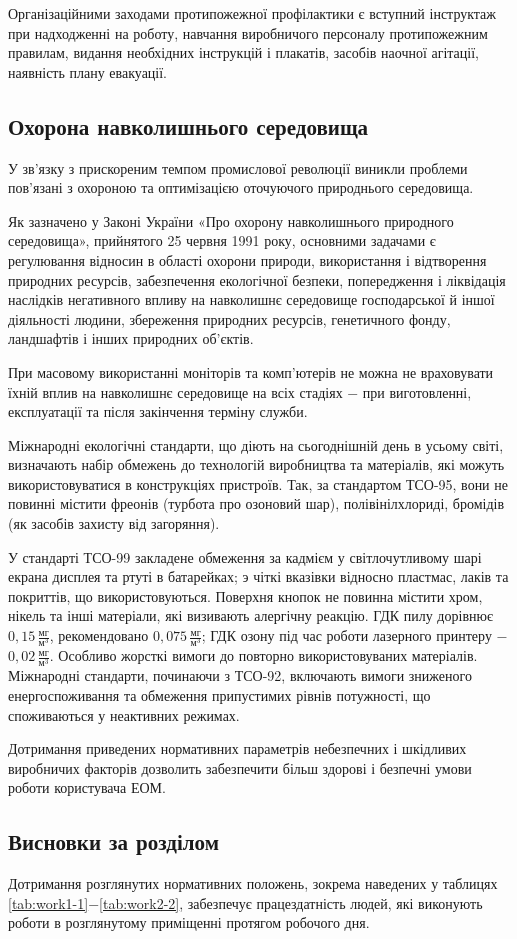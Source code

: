 Організаційними заходами протипожежної профілактики є вступний інструктаж при надходженні на роботу, навчання виробничого персоналу протипожежним правилам, видання необхідних інструкцій і плакатів, засобів наочної агітації, наявність плану евакуації.

\subsection{Охорона навколишнього середовища}

У зв’язку з прискореним темпом промислової революції виникли проблеми пов’язані з охороною та оптимізацією оточуючого природнього середовища.

Як зазначено у Законі України «Про охорону навколишнього природного середовища», прийнятого 25 червня 1991 року, основними задачами є регулювання відносин в області охорони природи, використання і відтворення природних ресурсів, забезпечення екологічної безпеки, попередження і ліквідація наслідків негативного впливу на навколишнє середовище господарської й іншої діяльності людини, збереження природних ресурсів, генетичного фонду, ландшафтів і інших природних об'єктів. 

При масовому використанні моніторів та комп’ютерів не можна не враховувати їхній вплив на навколишнє середовище на всіх стадіях $-$ при виготовленні, експлуатації та після закінчення терміну служби.

Міжнародні екологічні стандарти, що діють на сьогоднішній день в усьому світі, визначають набір обмежень до технологій виробництва та матеріалів, які можуть використовуватися в конструкціях пристроїв. Так, за стандартом ТСО-95, вони не повинні містити фреонів (турбота про озоновий шар), полівінілхлориді, бромідів (як засобів захисту від загоряння).

У стандарті ТСО-99 закладене обмеження за кадмієм у світлочутливому шарі екрана дисплея та ртуті в батарейках; э чіткі вказівки відносно пластмас, лаків та покриттів, що використовуються. Поверхня кнопок не повинна містити хром, нікель та інші матеріали, які визивають алергічну реакцію. ГДК пилу дорівнює $0,15 \, \frac{\text{мг}}{\text{м}^{3}}$, рекомендовано $0,075 \, \frac{\text{мг}}{\text{м}^{3}}$; ГДК озону під час роботи   лазерного принтеру  $-$ $0,02 \, \frac{\text{мг}}{\text{м}^{3}}$. Особливо жорсткі вимоги до повторно використовуваних матеріалів. Міжнародні стандарти, починаючи з ТСО-92, включають вимоги зниженого енергоспоживання та обмеження припустимих рівнів потужності, що споживаються у неактивних режимах.

Дотримання приведених нормативних параметрів небезпечних і шкідливих виробничих факторів дозволить забезпечити більш здорові і безпечні умови роботи користувача ЕОМ.

\subsection{Висновки за розділом}

Дотримання розглянутих нормативних положень, зокрема наведених у таблицях \ref{tab:work1-1}$-$\ref{tab:work2-2}, забезпечує працездатність людей, які виконують роботи в розглянутому приміщенні протягом робочого дня.
